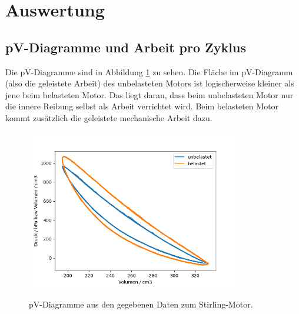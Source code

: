 \documentclass{article}
\begin{document}
\newpage


\section{Auswertung}


\subsection{pV-Diagramme und Arbeit pro Zyklus}

Die pV-Diagramme sind in Abbildung \ref{fig:pV_orig} zu sehen. Die Fläche im pV-Diagramm (also die geleistete Arbeit) des unbelasteten Motors ist logischerweise kleiner als jene beim belasteten Motor. Das liegt daran, dass beim unbelasteten Motor nur die innere Reibung selbst als Arbeit verrichtet wird. Beim belasteten Motor kommt zusätzlich die geleistete mechanische Arbeit dazu.


\begin{figure}[H]
\caption{pV-Diagramme aus den gegebenen Daten zum Stirling-Motor.  }
\includegraphics[height=7cm]{graphics/pV.png}
\label{fig:pV_orig}
\end{figure}
\end{document}
